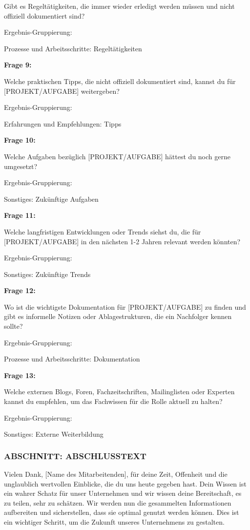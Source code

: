 \documentclass[
  10pt,
  ngerman,
  a4paper,
  toc=graduated,
  numbers=noenddot,
  headings=standardclasses,
  nonumberlist
]{scrartcl}
\begin{document}
Gibt es Regeltätigkeiten, die immer wieder erledigt werden müssen und nicht offiziell dokumentiert sind?

Ergebnis-Gruppierung:

Prozesse und Arbeitsschritte: Regeltätigkeiten

\textbf{Frage 9:}

Welche praktischen Tipps, die nicht offiziell dokumentiert sind, kannst du für [PROJEKT/AUFGABE] weitergeben?

Ergebnis-Gruppierung:

Erfahrungen und Empfehlungen: Tipps

\textbf{Frage 10:}

Welche Aufgaben bezüglich [PROJEKT/AUFGABE] hättest du noch gerne umgesetzt?

Ergebnis-Gruppierung:

Sonstiges: Zukünftige Aufgaben

\textbf{Frage 11:}

Welche langfristigen Entwicklungen oder Trends siehst du, die für [PROJEKT/AUFGABE] in den nächsten 1-2 Jahren relevant werden könnten?

Ergebnis-Gruppierung:

Sonstiges: Zukünftige Trends

\textbf{Frage 12:}

Wo ist die wichtigste Dokumentation für [PROJEKT/AUFGABE] zu finden und gibt es informelle Notizen oder Ablagestrukturen, die ein Nachfolger kennen sollte?

Ergebnis-Gruppierung:

Prozesse und Arbeitsschritte: Dokumentation

\textbf{Frage 13:}

Welche externen Blogs, Foren, Fachzeitschriften, Mailinglisten oder Experten kannst du empfehlen, um das Fachwissen für die Rolle aktuell zu halten?

Ergebnis-Gruppierung:

Sonstiges: Externe Weiterbildung

\subsubsection*{ABSCHNITT: ABSCHLUSSTEXT}

Vielen Dank, [Name des Mitarbeitenden], für deine Zeit, Offenheit und die unglaublich wertvollen Einblicke, die du uns heute gegeben hast. Dein Wissen ist ein wahrer Schatz für unser Unternehmen und wir wissen deine Bereitschaft, es zu teilen, sehr zu schätzen. Wir werden nun die gesammelten Informationen aufbereiten und sicherstellen, dass sie optimal genutzt werden können. Dies ist ein wichtiger Schritt, um die Zukunft unseres Unternehmens zu gestalten.
\end{document}
